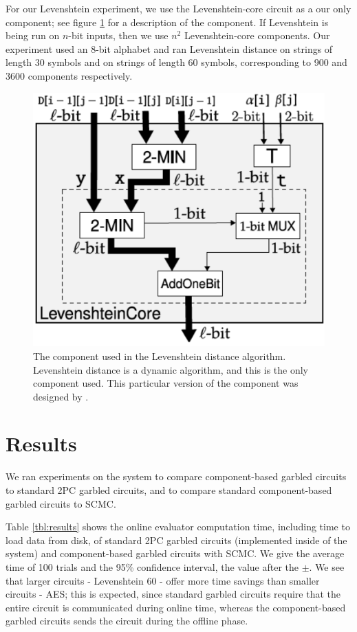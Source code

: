 For our Levenshtein experiment, we use the Levenshtein-core circuit as a our only component; see figure \ref{fig:leven-core} for a description of the component.
If Levenshtein is being run on $n$-bit inputs, then we use $n^2$ Levenshtein-core components. 
Our experiment used an 8-bit alphabet and ran Levenshtein distance on strings of length 30 symbols and on strings of length 60 symbols, corresponding to 900 and 3600 components respectively. 

\begin{figure}
    \center
    \includegraphics[scale=0.3]{leven_core}
    \caption{The component used in the Levenshtein distance algorithm. 
    Levenshtein distance is a dynamic algorithm, and this is the only component used. 
    This particular version of the component was designed by \cite{faster2pc}.}
    \label{fig:leven-core}
\end{figure}

\section{Results}


We ran experiments on the \CompGC system to compare component-based garbled circuits to standard 2PC garbled circuits, and to compare standard component-based garbled circuits to SCMC.

Table \ref{tbl:results} shows the online evaluator computation time, including time to load data from disk, of standard 2PC garbled circuits (implemented inside of the \CompGC system) and component-based garbled circuits with SCMC.
We give the average time of 100 trials and the 95\% confidence interval, the value after the $\pm$.
We see that larger circuits - Levenshtein 60 - offer more time savings than smaller circuits - AES; this is expected, since standard garbled circuits require that the entire circuit is communicated during online time, whereas the component-based garbled circuits sends the circuit during the offline phase. 

